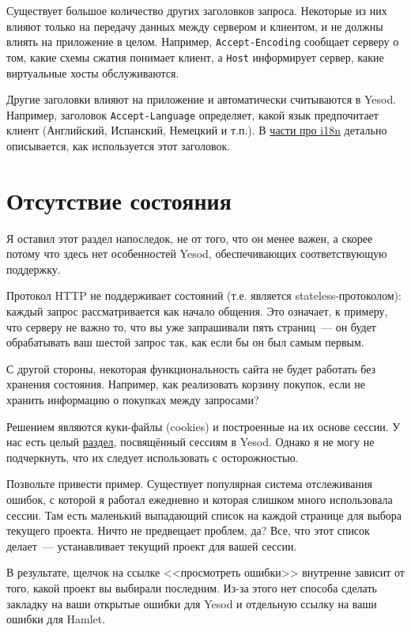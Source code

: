 Существует большое количество других заголовков запроса. Некоторые из них влияют только на
передачу данных между сервером и клиентом, и не должны влиять на приложение в целом.
Например, \verb*|Accept-Encoding| сообщает серверу о том, какие схемы сжатия понимает
клиент, а \verb*|Host| информирует сервер, какие виртуальные хосты обслуживаются.

Другие заголовки влияют на приложение и автоматически считываются в Yesod. Например,
заголовок \verb*|Accept-Language| определяет, какой язык предпочитает клиент (Английский,
Испанский, Немецкий и т.п.). В
\hyperref[chap:i18n]{части про i18n} детально описывается, как используется этот
заголовок.

\section{Отсутствие состояния}

Я оставил этот раздел напоследок, не от того, что он менее важен, а скорее потому что
здесь нет особенностей Yesod, обеспечивающих соответствующую поддержку.

Протокол HTTP не поддерживает состояний (т.е. является stateless-протоколом): каждый
запрос рассматривается
как начало общения. Это означает, к примеру, что серверу не важно то, что вы уже
запрашивали пять страниц~--- он будет обрабатывать ваш шестой запрос так, как если бы он
был самым первым.

С другой стороны, некоторая функциональность сайта не будет работать без хранения состояния. Например, как реализовать корзину покупок, если не хранить информацию о покупках между запросами?

Решением являются куки-файлы (cookies) и построенные на их основе сессии. У нас есть
целый
\hyperref[chap:sessions]{раздел}, посвящённый сессиям в Yesod. Однако я не могу не
подчеркнуть, что их следует использовать с осторожностью.

Позвольте привести пример. Существует популярная система отслеживания ошибок, с которой я
работал ежедневно и которая слишком много использовала сессии. Там есть маленький
выпадающий список на каждой странице для выбора текущего проекта. Ничто не предвещает
проблем, да? Все, что этот список делает~--- устанавливает текущий проект для вашей
сессии.

В результате, щелчок на ссылке <<просмотреть ошибки>> внутренне зависит от того, какой
проект вы выбирали последним. Из-за этого нет способа сделать закладку на ваши открытые
ошибки для Yesod и отдельную ссылку на ваши ошибки для Hamlet.

